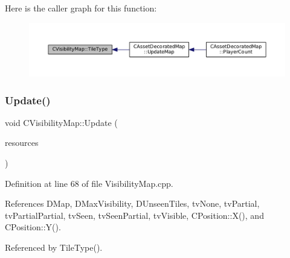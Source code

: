 Here is the caller graph for this function\+:\nopagebreak
\begin{figure}[H]
\begin{center}
\leavevmode
\includegraphics[width=350pt]{classCVisibilityMap_a8517fe52114dd469093fd1bd13482733_icgraph}
\end{center}
\end{figure}
\hypertarget{classCVisibilityMap_a5ca9902ef0bc2714617719800e20aa19}{}\label{classCVisibilityMap_a5ca9902ef0bc2714617719800e20aa19} 
\subsubsection{\texorpdfstring{Update()}{Update()}}
{\footnotesize\ttfamily void C\+Visibility\+Map\+::\+Update (\begin{DoxyParamCaption}\item[{const std\+::list$<$ std\+::weak\+\_\+ptr$<$ \hyperlink{classCPlayerAsset}{C\+Player\+Asset} $>$ $>$ \&}]{resources }\end{DoxyParamCaption})}



Definition at line 68 of file Visibility\+Map.\+cpp.



References D\+Map, D\+Max\+Visibility, D\+Unseen\+Tiles, tv\+None, tv\+Partial, tv\+Partial\+Partial, tv\+Seen, tv\+Seen\+Partial, tv\+Visible, C\+Position\+::\+X(), and C\+Position\+::\+Y().



Referenced by Tile\+Type().


